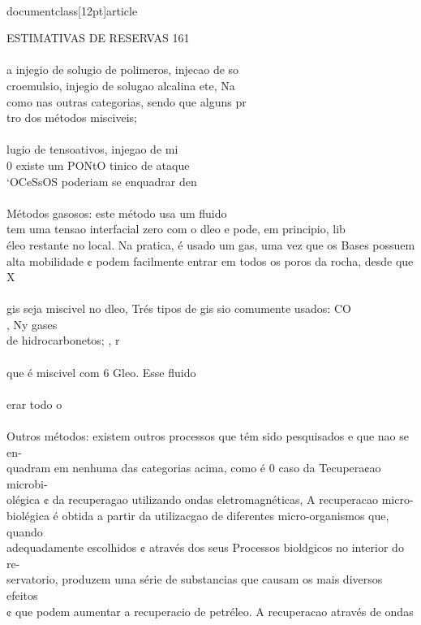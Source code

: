 \\documentclass[12pt]{article}
\begin{document}
{ESTIMATIVAS DE RESERVAS 161\\
\\
a injegio de solugio de polimeros, injecao de so\\
croemulsio, injegio de solugao alcalina ete, Na\\
como nas outras categorias, sendo que alguns pr\\
tro dos métodos misciveis;\\
\\
lugio de tensoativos, injegao de mi\\
0 existe um PONtO tinico de ataque\\
‘OCeSsOS poderiam se enquadrar den\\
\\
Métodos gasosos: este método usa um fluido\\
tem uma tensao interfacial zero com o dleo e pode, em principio, lib\\
éleo restante no local. Na pratica, é usado um gas, uma vez que os Bases possuem\\
alta mobilidade ¢ podem facilmente entrar em todos os poros da rocha, desde que X\\
\\
gis seja miscivel no dleo, Trés tipos de gis sio comumente usados: CO\\}, Ny gases\\
de hidrocarbonetos; , r\\
\\
que é miscivel com 6 Gleo. Esse fluido\\
\\
erar todo o\\
\\
Outros métodos: existem outros processos que tém sido pesquisados e que nao se en-\\
quadram em nenhuma das categorias acima, como é 0 caso da Tecupera¢ao microbi-\\
olégica ¢ da recuperagao utilizando ondas eletromagnéticas, A recuperacao micro-\\
biolégica é obtida a partir da utilizacgao de diferentes micro-organismos que, quando\\
adequadamente escolhidos ¢ através dos seus Processos bioldgicos no interior do re-\\
servatorio, produzem uma série de substancias que causam os mais diversos efeitos\\
¢ que podem aumentar a recuperacio de petréleo. A recuperacao através de ondas\\
\end{document}
